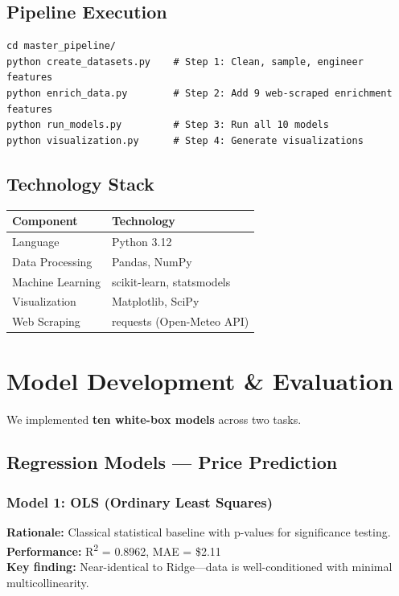\documentclass[12pt,a4paper]{article}
\begin{document}
\subsection{Pipeline Execution}

\begin{verbatim}
cd master_pipeline/
python create_datasets.py    # Step 1: Clean, sample, engineer features
python enrich_data.py        # Step 2: Add 9 web-scraped enrichment features
python run_models.py         # Step 3: Run all 10 models
python visualization.py      # Step 4: Generate visualizations
\end{verbatim}

\subsection{Technology Stack}

\begin{table}[H]
\centering
\begin{tabular}{ll}
\toprule
\textbf{Component} & \textbf{Technology} \\
\midrule
Language & Python 3.12 \\
Data Processing & Pandas, NumPy \\
Machine Learning & scikit-learn, statsmodels \\
Visualization & Matplotlib, SciPy \\
Web Scraping & requests (Open-Meteo API) \\
\bottomrule
\end{tabular}
\end{table}

\newpage

\section{Model Development \& Evaluation}

We implemented \textbf{ten white-box models} across two tasks.

\subsection{Regression Models --- Price Prediction}

\subsubsection*{Model 1: OLS (Ordinary Least Squares)}
\textbf{Rationale:} Classical statistical baseline with p-values for significance testing.\\
\textbf{Performance:} R\textsuperscript{2} = 0.8962, MAE = \$2.11\\
\textbf{Key finding:} Near-identical to Ridge---data is well-conditioned with minimal multicollinearity.
\end{document}
